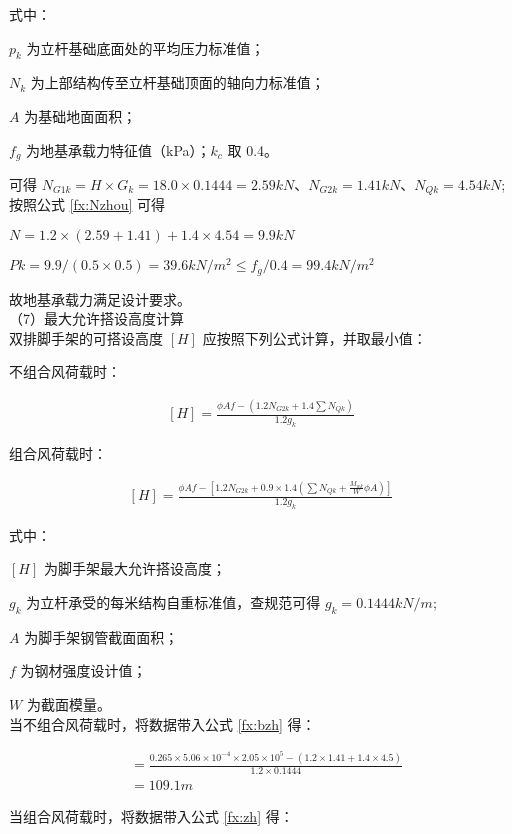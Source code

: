 式中：

$p_k$ 为立杆基础底面处的平均压力标准值；   

$N_k$ 为上部结构传至立杆基础顶面的轴向力标准值； 

$A$ 为基础地面面积；                       

$f_g$ 为地基承载力特征值（kPa）；$k_c$ 取 0.4。

可得 $N_{G1k}=H\times G_k=18.0\times 0.1444=2.59kN$、$N_{G2k}=1.41kN$、$N_{Qk}=4.54kN$;
按照公式 \ref{fx:Nzhou} 可得

$N=1.2\times (2.59+1.41)+1.4\times 4.54=9.9kN $

$Pk=9.9/(0.5×0.5)=39.6kN/m^2\leq f_g/0.4=99.4kN/m^2$

故地基承载力满足设计要求。\\

（7）最大允许搭设高度计算\\

双排脚手架的可搭设高度 $[H]$ 应按照下列公式计算，并取最小值：

不组合风荷载时：

\begin{align}
    \label{fx:bzh} 
    [H]=\frac{\phi Af-(1.2N_{G2k}+1.4\sum N_{Qk})}{1.2g_k}
\end{align}

组合风荷载时：

\begin{align}
    \label{fx:zh} 
    [H]=\frac{\phi Af-[1.2N_{G2k}+0.9\times 1.4(\sum N_{Qk}+\frac{M_{wk}}{W}\phi A)]}{1.2g_k}
\end{align}

式中：

$[H]$ 为脚手架最大允许搭设高度；

$g_k$ 为立杆承受的每米结构自重标准值，查规范可得 $g_k=0.1444kN/m$;

$A$ 为脚手架钢管截面面积； 

$f$ 为钢材强度设计值； 

$W$ 为截面模量。\\

当不组合风荷载时，将数据带入公式 \ref{fx:bzh} 得：

\begin{align*}
    [H] &=\frac{0.265\times 5.06\times10^{-4}\times 2.05\times 10^5-(1.2\times 1.41+1.4\times 4.5)}{1.2\times 0.1444}\\
    &=109.1m
\end{align*}

当组合风荷载时，将数据带入公式 \ref{fx:zh} 得：

